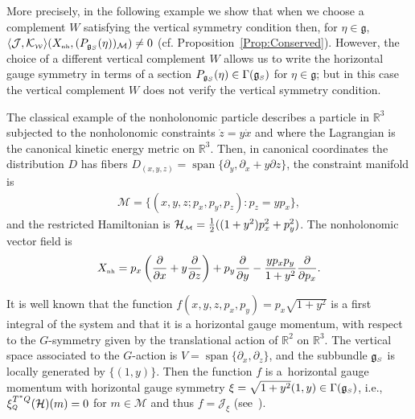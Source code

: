 \documentclass[10pt,a4paper]{amsart}
\numberwithin{equation}{section}
\def\W{\mathcal{W}}
\def\M{\mathcal{M}}
\def\J{\mathcal{J}}
\def\Ham{\mathcal{H}}
\def\R{\mathbb{R}}
\def\g{\mathfrak{g}}
\def\nh{{\mbox{\tiny{nh}}}}
\def\subW{{\mbox{\tiny{$\W$}}}}
\def\subM{{\mbox{\tiny{$\M$}}}}
\def\subSS{{\mbox{\tiny{$S$}}}}
\def\subQQ{{\mbox{\tiny{$Q$}}}}
\begin{document}
More precisely, in the following example we show that when we choose a
complement $W$ satisfying the vertical symmetry
condition then, for $\eta\in \g$,   $\langle \mathcal{J},\mathcal{K}_\subW\rangle (X_\nh,( P_{\mathfrak{g}_\subSS}(\eta))_\M ) \neq 0$  (cf. Proposition~\ref{Prop:Conserved}).
However, the choice of a dif\/ferent vertical complement $W$ allows us to write the horizontal gauge symmetry in terms of a section $P_{\g_S}(\eta)\in \Gamma(\g_\subSS)$ for $\eta\in\g$; but in this case the vertical complement $W$ does not verify the vertical symmetry condition.

 \begin{Example}
 The classical example of the nonholonomic particle describes a particle in $\R^3$
 subjected to the nonholonomic constraints $\dot z = y \dot x$ and where the
 Lagrangian is the canonical kinetic energy metric on $\R^3$. Then, in canonical coordinates
 the distribution $D$ has f\/ibers $D_{(x,y,z)} = \operatorname{span}\{ \partial_y, \partial_x+y\partial z \}$,
 the constraint manifold is
 \begin{gather*}
 \M = \{(x,y,z; p_x ,p_y , p_z)\colon  p_z = yp_x \},
 \end{gather*}
 and the restricted Hamiltonian is $\Ham_\subM = \frac{1}{2} ( (1+y^2)p_x^2+p_y^2 )$.
 The nonholonomic vector f\/ield is
 \begin{gather*}
 X_\nh = p_x\left(\frac{\partial}{\partial x} + y\frac{\partial}{\partial z} \right) + p_y\frac{\partial}{\partial y} - \frac{yp_xp_y}{1+y^2} \frac{\partial}{\partial p_x}.
 \end{gather*}

It is well known that the function $f(x,y,z,p_x,p_y) = p_x   \sqrt{1+y^2}$
is a f\/irst integral of the system and that it is a horizontal gauge momentum,
with respect to the $G$-symmetry given by the translational action of $\R^2$ on $\R^3$.
The vertical space associated to the $G$-action is $V = \operatorname{span}\{ \partial_x, \partial_z \}$, and
the subbundle $\g_\subSS$ is locally generated by $\{(1,y)\}$.
Then the function $f$ is a~horizontal gauge momentum with horizontal gauge symmetry
 $\xi =\sqrt{1+y^2}  (1,y) \in \Gamma(\mathfrak{g}_\subSS)$, i.e., $\xi_\subQQ^{T^*Q}(\Ham)(m)=0$ for $m\in\M$ and thus $f=\J_\xi$ (see~\cite{FSG2008}).


\end{Example}
\end{document}
